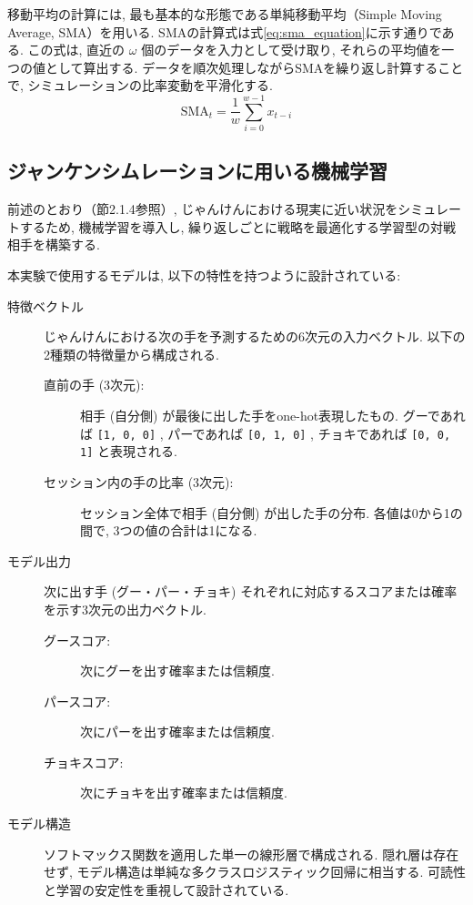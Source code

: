\documentclass[a4j, 12pt ]{jarticle}
\begin{document}
移動平均の計算には, 最も基本的な形態である単純移動平均（Simple Moving Average, SMA）を用いる. SMAの計算式は式\ref{eq:sma_equation}に示す通りである. この式は, 直近の \(\omega\) 個のデータを入力として受け取り, それらの平均値を一つの値として算出する. データを順次処理しながらSMAを繰り返し計算することで, シミュレーションの比率変動を平滑化する.\\
\begin{equation}\label{eq:sma_equation}
  \text{SMA}_t = \frac{1}{w} \sum_{i=0}^{w-1} x_{t - i}
\end{equation}

\subsection{ジャンケンシムレーションに用いる機械学習}
前述のとおり（節2.1.4参照）, じゃんけんにおける現実に近い状況をシミュレートするため, 機械学習を導入し, 繰り返しごとに戦略を最適化する学習型の対戦相手を構築する.

本実験で使用するモデルは, 以下の特性を持つように設計されている:
\begin{description}
  \item[特徴ベクトル]
  じゃんけんにおける次の手を予測するための6次元の入力ベクトル. 以下の2種類の特徴量から構成される.

  \begin{description}
    \item[直前の手 (3次元):]
    相手 (自分側) が最後に出した手をone-hot表現したもの. グーであれば \texttt{[1, 0, 0]} , パーであれば \texttt{[0, 1, 0]} , チョキであれば \texttt{[0, 0, 1]} と表現される.

    \item[セッション内の手の比率 (3次元):]
    セッション全体で相手 (自分側) が出した手の分布. 各値は0から1の間で, 3つの値の合計は1になる.
  \end{description}

  \item[モデル出力]
  次に出す手 (グー・パー・チョキ) それぞれに対応するスコアまたは確率を示す3次元の出力ベクトル.

  \begin{description}
    \item[グースコア:]
    次にグーを出す確率または信頼度.

    \item[パースコア:]
    次にパーを出す確率または信頼度.

    \item[チョキスコア:]
    次にチョキを出す確率または信頼度.
  \end{description}

  \item[モデル構造]
  ソフトマックス関数を適用した単一の線形層で構成される. 隠れ層は存在せず, モデル構造は単純な多クラスロジスティック回帰に相当する. 可読性と学習の安定性を重視して設計されている.
\end{description}
\end{document}
